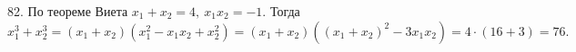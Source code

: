 82. По теореме Виета $x_1+x_2=4,\ x_1x_2=-1.$ Тогда $x_1^3+x_2^3=(x_1+x_2)(x_1^2-x_1x_2+x_2^2)=(x_1+x_2)((x_1+x_2)^2-3x_1x_2)=4\cdot(16+3)=76.$\\
